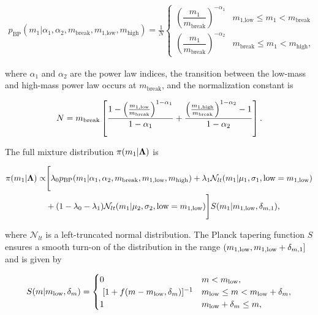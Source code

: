 \begin{eqnarray}
	p_\text{BP}(m_1 | \alpha_1, \alpha_2, m_\text{break}, m_\text{1,low}, m_\text{high}) = \frac{1}{N}
	\begin{cases}
		  \left(\dfrac{m_1}{m_\text{break}}\right)^{-\alpha_1} & m_\text{1,low} \leq m_1  < m_\text{break} \\
		  \left(\dfrac{m_1}{m_\text{break}}\right)^{-\alpha_2} & m_\text{break} \leq m_1  < m_\text{high},
	\end{cases}
\end{eqnarray}

\noindent where $\alpha_1$ and $\alpha_2$ are the power law indices, the transition between the low-mass and high-mass power law occurs at $m_\text{break}$, and the normalization constant is

\begin{equation}
	N = m_{\rm break} \left[
    \frac{1 - \left(\tfrac{m_{1,\rm low}}{m_{\rm break}}\right)^{1-\alpha_1}}{1-\alpha_1}
    + \frac{\left(\tfrac{m_{1,\rm high}}{m_{\rm break}}\right)^{1-\alpha_2} - 1}{1-\alpha_2}\right].
\end{equation}

\noindent The full mixture distribution $\pi(m_1|{\boldsymbol{\Lambda}})$ is

\begin{align}
 \pi(m_1 | {\boldsymbol{\Lambda}})\propto & \Biggl[ \lambda_0 p_{\rm BP}(m_1|\alpha_1, \alpha_2, m_{\rm break}, m_{1,{\rm low}}, m_{\rm high}) + \lambda_1 \mathcal{N}_{lt}(m_1 | \mu_1, \sigma_1, \text{low} = m_{1,{\rm low}}) \\ \nonumber
& + (1 - \lambda_0 - \lambda_1) \mathcal{N}_{lt}(m_1|\mu_2, \sigma_2, \text{low} = m_{1,{\rm low}}) \Biggr] S(m_1 | m_{1,{\rm low}}, \delta_{m,1}),
\end{align}

\noindent where $\mathcal{N}_{lt}$ is a left-truncated normal distribution. The Planck tapering function $S$ ensures a smooth turn-on of the distribution in the range $(m_{\rm 1,low}, m_{\rm 1,low} + \delta_{m,1}]$ and is given by

\begin{eqnarray}
S(m|m_{\rm low}, \delta_m) =  \begin{cases}
0 & m < m_{\rm low}, \\\
[1 + f(m - m_{\rm low}, \delta_m)]^{-1}  & m_{\rm low} \leq m < m_{\rm low} + \delta_m, \\
1 & m_{\rm low} + \delta_m \leq m,
\end{cases}
\end{eqnarray}


